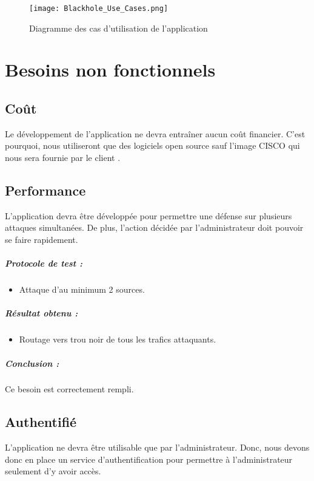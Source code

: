 \begin{figure}[H]
    \texttt{[image: Blackhole\_Use\_Cases.png]}
    \caption{Diagramme des cas d'utilisation de l'application}
    \label{fig:use_cases_diagramme}
\end{figure}

\newpage

\section{Besoins non fonctionnels}

\subsection{Coût}
Le développement de l'application ne devra entraîner aucun coût financier. C'est pourquoi, nous utiliseront que des logiciels open source sauf l'image CISCO qui nous sera fournie par le client .

\subsection{Performance}
L'application devra être développée pour permettre une défense sur plusieurs attaques simultanées. De plus, l'action décidée par l'administrateur doit pouvoir se faire rapidement. %

\subparagraph{Protocole de test :}
\begin{itemize}
    \item Attaque d'au minimum 2 sources.
\end{itemize}
\subparagraph{Résultat obtenu :}
    \begin{itemize}
    \item Routage vers trou noir de tous les trafics attaquants.
\end{itemize}
\subparagraph{Conclusion :}Ce besoin est correctement rempli.

\subsection{Authentifié}
L’application ne devra être utilisable que par l'administrateur. Donc, nous devons donc en place un service d'authentification pour permettre à l'administrateur seulement d'y avoir accès.

